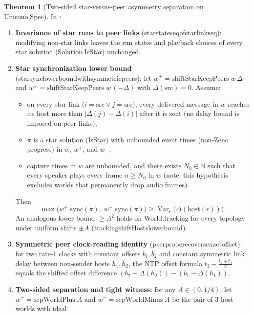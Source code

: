\documentclass[11pt,a4paper]{article}
\DeclareRobustCommand{\lean}[1]{{\ttfamily\def\_{\textunderscore\allowbreak}#1}}
\theoremstyle{definition}
\newtheorem{theorem}[definition]{Theorem}
\begin{document}
\begin{theorem}[Two-sided star-versus-peer asymmetry separation on \lean{Unisono.Spec}]
\label{thm:star-peer-sep}
In :
\begin{enumerate}
\item \textbf{Invariance of star runs to peer links}
  (\lean{star\_states\_eq\_of\_star\_links\_eq}): modifying non-star links
  leaves the run states and playback choices of every star solution
  (\lean{Solution.IsStar}) unchanged.
\item \textbf{Star synchronization lower bound}
  (\lean{star\_sync\_lower\_bound\_with\_symmetric\_peers}): let
  $w^+ = \mathrm{shiftStarKeepPeers}\;w\,\Delta$ and
  $w^- = \mathrm{shiftStarKeepPeers}\;w\,(-\Delta)$ with $\Delta(\mathrm{src}) = 0$.
  Assume:
  \begin{itemize}
  \item on every star link ($i = \mathrm{src} \lor j = \mathrm{src}$), every
    delivered message in $w$ reaches its host more than
    $|\Delta(j) - \Delta(i)|$ after it is sent (no delay bound is imposed on
    peer links),
  \item $\pi$ is a star solution (\lean{IsStar}) with unbounded event times
    (non-Zeno progress) in $w$, $w^+$, and $w^-$,
  \item capture times in $w$ are unbounded, and there exists $N_0 \in \mathbb{N}$
    such that every speaker plays every frame $n \ge N_0$ in $w$ (note: this
    hypothesis excludes worlds that permanently drop audio frames).
  \end{itemize}
  Then
  \[
    \max\bigl(w^+.\mathrm{sync}(\pi),\; w^-.\mathrm{sync}(\pi)\bigr)
    \ge \operatorname{Var}_r\bigl(\Delta(\mathrm{host}(r))\bigr) .
  \]
  An analogous lower bound $\ge A^2$ holds on \lean{World.tracking} for every
  topology under uniform shifts $\pm A$ (\lean{tracking\_shiftHosts\_lower\_bound}).
\item \textbf{Symmetric peer clock-reading identity}
  (\lean{peer\_probe\_recovers\_exact\_offset}): for two rate-1 clocks with
  constant offsets $b_1, b_2$ and constant symmetric link delay between
  non-sender hosts $h_1, h_2$, the NTP offset formula \cite{mills2010}
  $t_2 - \frac{t_1 + t_4}{2}$ equals the shifted offset difference
  $(b_2 - \Delta(h_2)) - (b_1 - \Delta(h_1))$.
\item \textbf{Two-sided separation and tight witness:}
  for any $A \in (0, 1/4)$, let $w^+ = \mathrm{sepWorldPlus}\;A$ and
  $w^- = \mathrm{sepWorldMinus}\;A$ be the pair of 3-host worlds with ideal

\end{enumerate}
\end{theorem}
\end{document}

